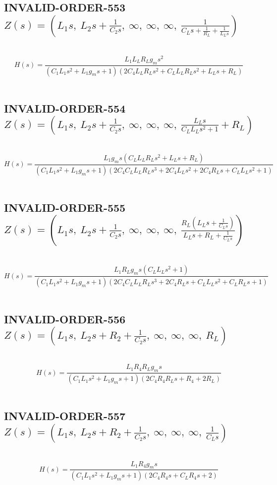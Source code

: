 \documentclass{article}
\begin{document}
\subsection{INVALID-ORDER-553 $Z(s) = \left( L_{1} s, \  L_{2} s + \frac{1}{C_{2} s}, \  \infty, \  \infty, \  \infty, \  \frac{1}{C_{L} s + \frac{1}{R_{L}} + \frac{1}{L_{L} s}}\right)$ } \ 
\textbf{\[H(s) = \frac{L_{1} L_{L} R_{L} g_{m} s^{2}}{\left(C_{1} L_{1} s^{2} + L_{1} g_{m} s + 1\right) \left(2 C_{4} L_{L} R_{L} s^{2} + C_{L} L_{L} R_{L} s^{2} + L_{L} s + R_{L}\right)}\] } \ 
\subsection{INVALID-ORDER-554 $Z(s) = \left( L_{1} s, \  L_{2} s + \frac{1}{C_{2} s}, \  \infty, \  \infty, \  \infty, \  \frac{L_{L} s}{C_{L} L_{L} s^{2} + 1} + R_{L}\right)$ } \ 
\textbf{\[H(s) = \frac{L_{1} g_{m} s \left(C_{L} L_{L} R_{L} s^{2} + L_{L} s + R_{L}\right)}{\left(C_{1} L_{1} s^{2} + L_{1} g_{m} s + 1\right) \left(2 C_{4} C_{L} L_{L} R_{L} s^{3} + 2 C_{4} L_{L} s^{2} + 2 C_{4} R_{L} s + C_{L} L_{L} s^{2} + 1\right)}\] } \ 
\subsection{INVALID-ORDER-555 $Z(s) = \left( L_{1} s, \  L_{2} s + \frac{1}{C_{2} s}, \  \infty, \  \infty, \  \infty, \  \frac{R_{L} \left(L_{L} s + \frac{1}{C_{L} s}\right)}{L_{L} s + R_{L} + \frac{1}{C_{L} s}}\right)$ } \ 
\textbf{\[H(s) = \frac{L_{1} R_{L} g_{m} s \left(C_{L} L_{L} s^{2} + 1\right)}{\left(C_{1} L_{1} s^{2} + L_{1} g_{m} s + 1\right) \left(2 C_{4} C_{L} L_{L} R_{L} s^{3} + 2 C_{4} R_{L} s + C_{L} L_{L} s^{2} + C_{L} R_{L} s + 1\right)}\] } \ 
\subsection{INVALID-ORDER-556 $Z(s) = \left( L_{1} s, \  L_{2} s + R_{2} + \frac{1}{C_{2} s}, \  \infty, \  \infty, \  \infty, \  R_{L}\right)$ } \ 
\textbf{\[H(s) = \frac{L_{1} R_{4} R_{L} g_{m} s}{\left(C_{1} L_{1} s^{2} + L_{1} g_{m} s + 1\right) \left(2 C_{4} R_{4} R_{L} s + R_{4} + 2 R_{L}\right)}\] } \ 
\subsection{INVALID-ORDER-557 $Z(s) = \left( L_{1} s, \  L_{2} s + R_{2} + \frac{1}{C_{2} s}, \  \infty, \  \infty, \  \infty, \  \frac{1}{C_{L} s}\right)$ } \ 
\textbf{\[H(s) = \frac{L_{1} R_{4} g_{m} s}{\left(C_{1} L_{1} s^{2} + L_{1} g_{m} s + 1\right) \left(2 C_{4} R_{4} s + C_{L} R_{4} s + 2\right)}\] } \ 
\end{document}

